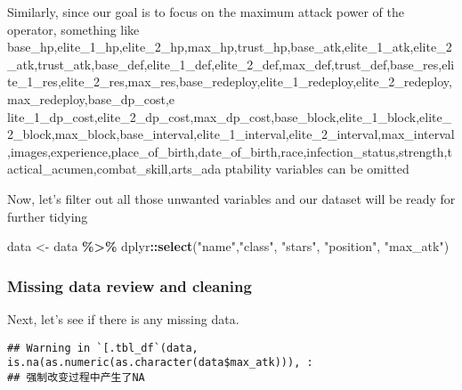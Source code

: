 \documentclass[
]{article}
\newenvironment{Shaded}{\begin{snugshade}}{\end{snugshade}}
\newcommand{\CommentTok}[1]{\textcolor[rgb]{0.56,0.35,0.01}{\textit{#1}}}
\newcommand{\FunctionTok}[1]{\textcolor[rgb]{0.13,0.29,0.53}{\textbf{#1}}}
\newcommand{\NormalTok}[1]{#1}
\newcommand{\OtherTok}[1]{\textcolor[rgb]{0.56,0.35,0.01}{#1}}
\newcommand{\SpecialCharTok}[1]{\textcolor[rgb]{0.81,0.36,0.00}{\textbf{#1}}}
\newcommand{\StringTok}[1]{\textcolor[rgb]{0.31,0.60,0.02}{#1}}
\begin{document}
Similarly, since our goal is to focus on the maximum attack power of the
operator, something like
base\_hp,elite\_1\_hp,elite\_2\_hp,max\_hp,trust\_hp,base\_atk,elite\_1\_atk,elite\_2\_atk,trust\_atk,base\_def,elite\_1\_def,elite\_2\_def,max\_def,trust\_def,base\_res,elite\_1\_res,elite\_2\_res,max\_res,base\_redeploy,elite\_1\_redeploy,elite\_2\_redeploy,max\_redeploy,base\_dp\_cost,e
lite\_1\_dp\_cost,elite\_2\_dp\_cost,max\_dp\_cost,base\_block,elite\_1\_block,elite\_2\_block,max\_block,base\_interval,elite\_1\_interval,elite\_2\_interval,max\_interval,images,experience,place\_of\_birth,date\_of\_birth,race,infection\_status,strength,tactical\_acumen,combat\_skill,arts\_ada
ptability variables can be omitted

Now, let's filter out all those unwanted variables and our dataset will
be ready for further tidying

\begin{Shaded}
\begin{Highlighting}[]
\NormalTok{data }\OtherTok{\textless{}{-}}\NormalTok{ data }\SpecialCharTok{\%\textgreater{}\%}
\NormalTok{  dplyr}\SpecialCharTok{::}\FunctionTok{select}\NormalTok{(}\StringTok{"name"}\NormalTok{,}\StringTok{"class"}\NormalTok{, }\StringTok{"stars"}\NormalTok{, }\StringTok{"position"}\NormalTok{, }\StringTok{"max\_atk"}\NormalTok{)}
\end{Highlighting}
\end{Shaded}

\subsubsection{Missing data review and
cleaning}\label{missing-data-review-and-cleaning}

Next, let's see if there is any missing data.

\begin{Shaded}
\end{Shaded}

\begin{verbatim}
## Warning in `[.tbl_df`(data, is.na(as.numeric(as.character(data$max_atk))), :
## 强制改变过程中产生了NA
\end{verbatim}
\end{document}
